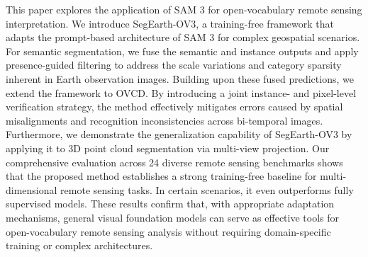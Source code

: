 \documentclass[twocolumn,switch,times]{article}
\newcommand{\samov}{SegEarth-OV\textcolor{cvprpink}{3}\xspace}
\begin{document}


This paper explores the application of SAM 3 for open-vocabulary remote sensing interpretation. We introduce \samov, a training-free framework that adapts the prompt-based architecture of SAM 3 for complex geospatial scenarios. For semantic segmentation, we fuse the semantic and instance outputs and apply presence-guided filtering to address the scale variations and category sparsity inherent in Earth observation images. Building upon these fused predictions, we extend the framework to OVCD. By introducing a joint instance- and pixel-level verification strategy, the method effectively mitigates errors caused by spatial misalignments and recognition inconsistencies across bi-temporal images. Furthermore, we demonstrate the generalization capability of \samov by applying it to 3D point cloud segmentation via multi-view projection. Our comprehensive evaluation across 24 diverse remote sensing benchmarks shows that the proposed method establishes a strong training-free baseline for multi-dimensional remote sensing tasks. In certain scenarios, it even outperforms fully supervised models. These results confirm that, with appropriate adaptation mechanisms, general visual foundation models can serve as effective tools for open-vocabulary remote sensing analysis without requiring domain-specific training or complex architectures.






\footnotesize{}


\end{document}
